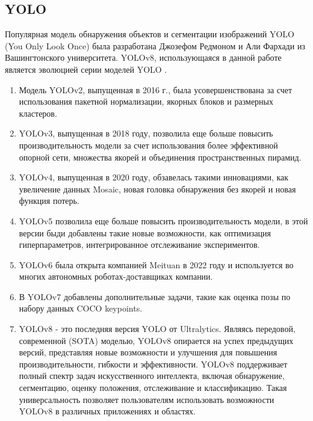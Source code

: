 \subsection{YOLO}

Популярная модель обнаружения объектов и сегментации изображений YOLO (You Only Look Once) была разработана Джозефом Редмоном и Али Фархади из Вашингтонского университета. YOLOv8, использующаяся в данной работе является эволюцией серии моделей YOLO \cite{YOLOv8}.
\begin{enumerate}
\item Модель YOLOv2, выпущенная в 2016 г., была усовершенствована за счет использования пакетной нормализации, якорных блоков и размерных кластеров.
\item YOLOv3, выпущенная в 2018 году, позволила еще больше повысить производительность модели за счет использования более эффективной опорной сети, множества якорей и объединения пространственных пирамид.
\item YOLOv4, выпущенная в 2020 году, обзавелась такими инновациями, как увеличение данных Mosaic, новая головка обнаружения без якорей и новая функция потерь.
\item YOLOv5 позволила еще больше повысить производительность модели, в этой версии быди добавлены такие новые возможности, как оптимизация гиперпараметров, интегрированное отслеживание экспериментов.
\item YOLOv6 была открыта компанией Meituan в 2022 году и используется во многих автономных роботах-доставщиках компании.
\item В YOLOv7 добавлены дополнительные задачи, такие как оценка позы по набору данных COCO keypoints.
\item YOLOv8 - это последняя версия YOLO от Ultralytics. Являясь передовой, современной (SOTA) моделью, YOLOv8 опирается на успех предыдущих версий, представляя новые возможности и улучшения для повышения производительности, гибкости и эффективности. YOLOv8 поддерживает полный спектр задач искусственного интеллекта, включая обнаружение, сегментацию, оценку положения, отслеживание и классификацию. Такая универсальность позволяет пользователям использовать возможности YOLOv8 в различных приложениях и областях.
\end{enumerate}







